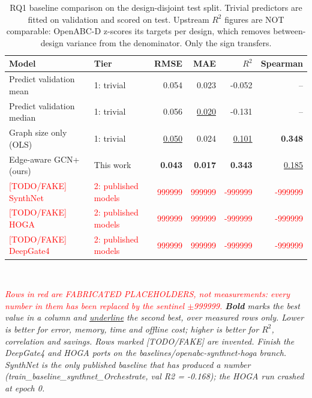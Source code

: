 \begin{table}[htbp]
\centering
\caption{RQ1 baseline comparison on the design-disjoint test split. Trivial predictors are fitted on validation and scored on test. Upstream $R^2$ figures are NOT comparable: OpenABC-D z-scores its targets per design, which removes between-design variance from the denominator. Only the sign transfers.}
\label{tab:rq1_baselines}
\small
\begin{tabular}{llrrrr}
\toprule
\textbf{Model} & \textbf{Tier} & \textbf{RMSE} & \textbf{MAE} & \textbf{$R^2$} & \textbf{Spearman} \\
\midrule
Predict validation mean & 1: trivial & 0.054 & 0.023 & -0.052 & -- \\
Predict validation median & 1: trivial & 0.056 & \underline{0.020} & -0.131 & -- \\
Graph size only (OLS) & 1: trivial & \underline{0.050} & 0.024 & \underline{0.101} & \textbf{0.348} \\
Edge-aware GCN+ (ours) & This work & \textbf{0.043} & \textbf{0.017} & \textbf{0.343} & \underline{0.185} \\
\textcolor{red}{{[TODO/FAKE] SynthNet}} & \textcolor{red}{2: published models} & \textcolor{red}{999999} & \textcolor{red}{999999} & \textcolor{red}{-999999} & \textcolor{red}{-999999} \\
\textcolor{red}{{[TODO/FAKE] HOGA}} & \textcolor{red}{2: published models} & \textcolor{red}{999999} & \textcolor{red}{999999} & \textcolor{red}{-999999} & \textcolor{red}{-999999} \\
\textcolor{red}{{[TODO/FAKE] DeepGate4}} & \textcolor{red}{2: published models} & \textcolor{red}{999999} & \textcolor{red}{999999} & \textcolor{red}{-999999} & \textcolor{red}{-999999} \\
\bottomrule
\end{tabular}
\\[4pt]\begin{minipage}{\linewidth}\footnotesize\emph{\textcolor{red}{Rows in red are FABRICATED PLACEHOLDERS, not measurements: every number in them has been replaced by the sentinel $\pm$999999.} \textbf{Bold} marks the best value in a column and \underline{underline} the second best, over measured rows only. Lower is better for error, memory, time and offline cost; higher is better for $R^2$, correlation and savings. Rows marked [TODO/FAKE] are invented. Finish the DeepGate4 and HOGA ports on the baselines/openabc-synthnet-hoga branch. SynthNet is the only published baseline that has produced a number (train\_baseline\_synthnet\_Orchestrate, val R2 = -0.168); the HOGA run crashed at epoch 0.}\end{minipage}
\end{table}
